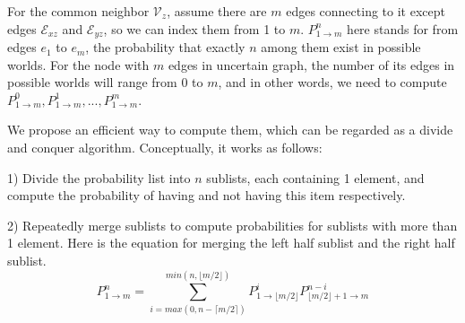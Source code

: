 \documentclass[\main/thesis.tex]{subfiles}
\begin{document}


For the common neighbor $\mathcal{V}_z$, assume there are $m$ edges connecting to it except edges $\mathcal{E}_{xz}$ and $\mathcal{E}_{yz}$, so we can index them from 1 to $m$. $P_{1\rightarrow m}^n$ here stands for from edges $e_1$ to $e_m$, the probability that exactly $n$ among them exist in possible worlds. For the node with $m$ edges in uncertain graph, the number of its edges in possible worlds will range from 0 to $m$, and in other words, we need to compute $P_{1\rightarrow m}^0, P_{1\rightarrow m}^1, ..., P_{1\rightarrow m}^m$. 

We propose an efficient way to compute them, which can be regarded as a divide and conquer algorithm. Conceptually, it works as follows:

1) Divide the probability list into $n$ sublists, each containing 1 element, and compute the probability of having and not having this item respectively.

2) Repeatedly merge sublists to compute probabilities for sublists with more than 1 element. Here is the equation for merging the left half sublist and the right half sublist.
\begin{equation}
P_{1\rightarrow m}^n=\sum_{i=max(0,n-\lceil m/2 \rceil)}^{min(n,\lfloor m/2 \rfloor)}P_{1\rightarrow{\lfloor m/2 \rfloor}}^i P_{{\lfloor m/2 \rfloor}+1\rightarrow m}^{n-i}
\label{divide-conquer-specific}
\end{equation}
\end{document}
